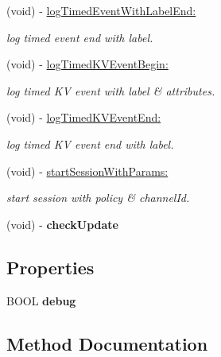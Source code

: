 \begin{DoxyCompactItemize}
(void) -\/ \hyperlink{interfaceAnalyticsUmeng_a1c3dde0d83e1d6a4f40b3b39e6cde2a9}{log\+Timed\+Event\+With\+Label\+End\+:}
\begin{DoxyCompactList}\small\item\em log timed event end with label. \end{DoxyCompactList}\item 
(void) -\/ \hyperlink{interfaceAnalyticsUmeng_a4174fe428a8b275baecbe78d23ec6843}{log\+Timed\+K\+V\+Event\+Begin\+:}
\begin{DoxyCompactList}\small\item\em log timed KV event with label \& attributes. \end{DoxyCompactList}\item 
(void) -\/ \hyperlink{interfaceAnalyticsUmeng_ab9986d459e9d420450f291749e14d06f}{log\+Timed\+K\+V\+Event\+End\+:}
\begin{DoxyCompactList}\small\item\em log timed KV event end with label. \end{DoxyCompactList}\item 
(void) -\/ \hyperlink{interfaceAnalyticsUmeng_a6276970a7dc255909fa8271f48f10f66}{start\+Session\+With\+Params\+:}
\begin{DoxyCompactList}\small\item\em start session with policy \& channel\+Id. \end{DoxyCompactList}\item 
\mbox{\label{interfaceAnalyticsUmeng_a6dd276300b61fa701c428942d85f042b}} 
(void) -\/ {\bfseries check\+Update}
\end{DoxyCompactItemize}
\subsection*{Properties}
\begin{DoxyCompactItemize}
\item 
\mbox{\label{interfaceAnalyticsUmeng_a5172f9cb999261bd0fc947e2205ebef7}} 
B\+O\+OL {\bfseries debug}
\end{DoxyCompactItemize}


\subsection{Method Documentation}
\mbox{\label{interfaceAnalyticsUmeng_a3e37a1fded47b9dc95bf9d802803a43a}} 
